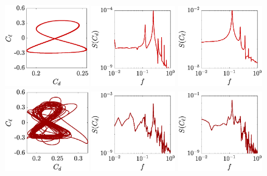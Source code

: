 \begin{figure}
  \centering
  \includegraphics[width=0.325\textwidth]{./fig/AR4p5/Cl_Cd_Re425.eps}
  \includegraphics[width=0.325\textwidth]{./fig/AR4p5/Cd_f_Re425.eps}
  \includegraphics[width=0.325\textwidth]{./fig/AR4p5/Cl_f_Re425.eps} 
  \includegraphics[width=0.325\textwidth]{./fig/AR4p5/Cl_Cd_Re450.eps}
  \includegraphics[width=0.325\textwidth]{./fig/AR4p5/Cd_f_Re450.eps}
  \includegraphics[width=0.325\textwidth]{./fig/AR4p5/Cl_f_Re450.eps} 

\end{figure}
